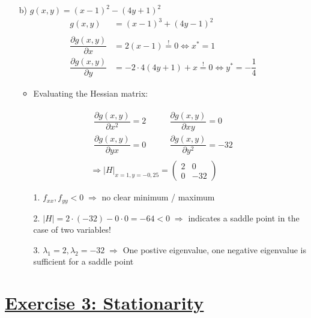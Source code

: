 \documentclass[12pt,a4paper]{article}
\newcommand{\tmpsection}[1]{}
\let\tmpsection=\section
\renewcommand{\section}[1]{\tmpsection{\underline{#1}} }
\begin{document}
\begin{itemize}
\begin{itemize}
    \end{itemize}
    \item[b)] $g(x,y) = (x -1)^2 - (4y + 1)^2$
    \begin{align*}
      g(x,y) & = (x -1)^3 + (4y - 1)^2\\
      & \\
      \dfrac{\partial g(x,y)}{\partial x} & = 2(x - 1) \overset{!}{=} 0 \Leftrightarrow x^{*} = 1 \\
      \dfrac{\partial g(x,y)}{\partial y} & = - 2 \cdot 4 (4y + 1) + x \overset{!}{=} 0 \Leftrightarrow y^{*} = - \dfrac{1}{4} 
    \end{align*}
    \begin{itemize}
      \item Evaluating the Hessian matrix:
    \end{itemize}
    \begin{align*}
        \begin{matrix}
      \dfrac{\partial g(x,y)}{\partial x^2} = 2 \qquad  & \dfrac{\partial g(x,y)}{\partial xy} = 0 \\
      \dfrac{\partial g(x,y)}{\partial yx} = 0  \qquad  & \dfrac{\partial g(x,y)}{\partial y^2} = -32
      \end{matrix}\\
      \Rightarrow \left| H \right|_{x = 1, y = - 0,25} = 
      \begin{pmatrix}
        2 & 0 \\
        0 & -32
      \end{pmatrix}
    \end{align*}
    \begin{itemize}
      \item[1.] $f_{xx}, f_{yy} < 0 \; \Rightarrow$ no clear minimum / maximum
      \item[2.] $|H| = 2 \cdot (-32) - 0 \cdot 0 = - 64 < 0 \; \Rightarrow$ indicates a saddle point in the case of two variables!
      \item[3.] $\lambda_1 = 2, \lambda_2 = -32 \; \Rightarrow$ One postive eigenvalue, one negative eigenvalue is sufficient for a saddle point 
    \end{itemize}
\end{itemize}

\hypertarget{exercise-3-stationarity}{%
\section{Exercise 3: Stationarity}\label{exercise-3-stationarity}}
\end{document}
